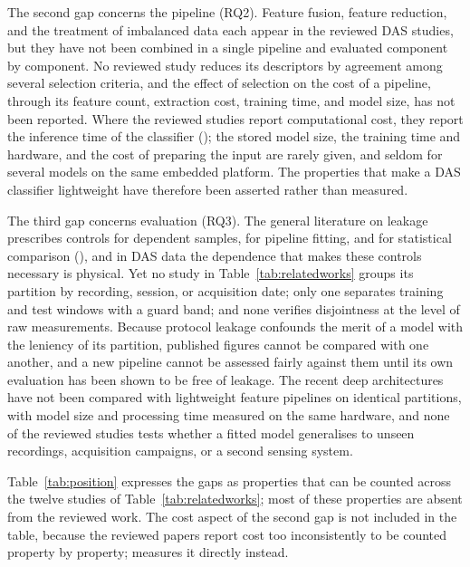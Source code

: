The second gap concerns the pipeline (RQ2). Feature fusion, feature reduction, and the treatment of imbalanced data each appear in the reviewed DAS studies, but they have not been combined in a single pipeline and evaluated component by component. No reviewed study reduces its descriptors by agreement among several selection criteria, and the effect of selection on the cost of a pipeline, through its feature count, extraction cost, training time, and model size, has not been reported. Where the reviewed studies report computational cost, they report the inference time of the classifier (); the stored model size, the training time and hardware, and the cost of preparing the input are rarely given, and seldom for several models on the same embedded platform. The properties that make a DAS classifier lightweight have therefore been asserted rather than measured.

The third gap concerns evaluation (RQ3). The general literature on leakage prescribes controls for dependent samples, for pipeline fitting, and for statistical comparison (), and in DAS data the dependence that makes these controls necessary is physical. Yet no study in Table~\ref{tab:relatedworks} groups its partition by recording, session, or acquisition date; only one separates training and test windows with a guard band; and none verifies disjointness at the level of raw measurements. Because protocol leakage confounds the merit of a model with the leniency of its partition, published figures cannot be compared with one another, and a new pipeline cannot be assessed fairly against them until its own evaluation has been shown to be free of leakage. The recent deep architectures have not been compared with lightweight feature pipelines on identical partitions, with model size and processing time measured on the same hardware, and none of the reviewed studies tests whether a fitted model generalises to unseen recordings, acquisition campaigns, or a second sensing system.

Table~\ref{tab:position} expresses the gaps as properties that can be counted across the twelve studies of Table~\ref{tab:relatedworks}; most of these properties are absent from the reviewed work. The cost aspect of the second gap is not included in the table, because the reviewed papers report cost too inconsistently to be counted property by property;  measures it directly instead.

